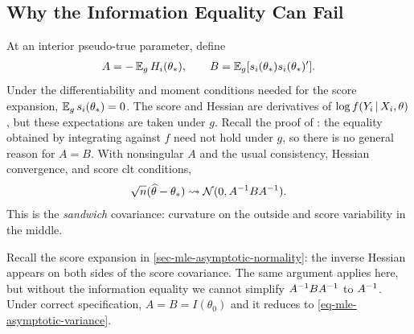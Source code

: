 \documentclass[a4paper,12pt]{article}
\begin{document}
\subsection{Why the Information Equality Can Fail}

At an interior pseudo-true parameter, define
\begin{align}
	A=-\operatorname{\mathbb{E}}_gH_i(\theta_*),
	\qquad B=\operatorname{\mathbb{E}}_g[s_i(\theta_*)s_i(\theta_*)^{\prime}].
\end{align}
Under the differentiability and moment conditions needed for the score expansion,
$\operatorname{\mathbb{E}}_gs_i(\theta_*)=0$.
The score and Hessian are derivatives of $\log f(Y_i\mathpunct{}|\mathpunct{} X_i,\theta)$,
but these expectations are taken under $g$.
Recall the proof of :
the equality obtained by integrating against $f$ need not hold under $g$,
so there is no general reason for $A=B$.
With nonsingular $A$ and the usual consistency, Hessian convergence, and score \gls{clt} conditions,
\begin{align}\label{eq-sandwich}
	\sqrt n(\widehat\theta-\theta_*)
	\overset{}{\leadsto}\operatorname{\mathcal{N}}(0,A^{-1} BA^{-1}).
\end{align}
This is the \emph{sandwich} covariance:
curvature on the outside and score variability in the middle.

\begin{remark}
	Recall the score expansion in \autoref{sec-mle-asymptotic-normality}:
	the inverse Hessian appears on both sides of the score covariance.
	The same argument applies here, but without the information equality we cannot simplify $A^{-1} BA^{-1}$ to $A^{-1}$.
	Under correct specification, $A=B=I(\theta_0)$ and it reduces to \eqref{eq-mle-asymptotic-variance}.
\end{remark}
\end{document}
